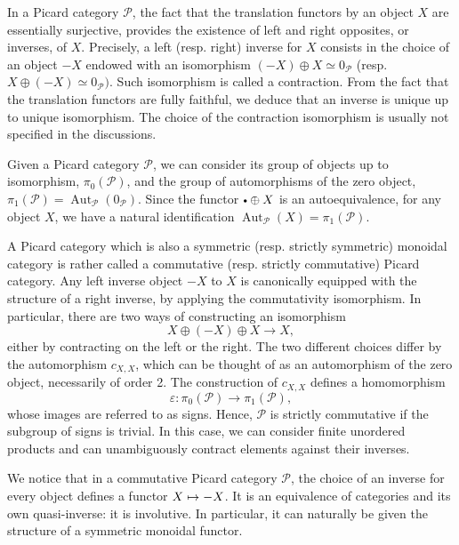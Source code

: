 \documentclass[11pt]{article}
\newcommand{\resp}{resp.\xspace}
\newcommand{\sbullet}{{\scriptscriptstyle\bullet}}
\newcommand{\csbullet}{{\raisebox{1pt}{$\sbullet$}}}
\newcommand\mto{\mathchoice{\longmapsto}{\mapsto}{\mapsto}{\mapsto}}
\theoremstyle{plain}
\theoremstyle{definition}
\newcommand{\Pcal}{\mathcal P}
\DeclareMathOperator{\Aut}{Aut}
\begin{document}
In a Picard category $\Pcal$, the fact that the translation functors by an object $X$ are essentially surjective, provides the existence of left and right opposites, or inverses, of $X$. Precisely, a left (\resp right) inverse for $X$ consists in the choice of an object $-X$ endowed with an isomorphism $(-X)\oplus X\simeq 0_{\Pcal}$ (\resp $X\oplus (-X)\simeq 0_{\Pcal})$. Such isomorphism is called a contraction. From the fact that the translation functors are fully faithful, we deduce that an inverse is unique up to unique isomorphism. The choice of the contraction isomorphism is usually not specified in the discussions.

Given a Picard category $\Pcal$, we can consider its group of objects up to isomorphism, $\pi_0(\Pcal)$, and the group of automorphisms of the zero object, $\pi_1(\Pcal) = \Aut_{\Pcal}(0_{\Pcal})$. Since the functor $\csbullet \oplus X$ is an autoequivalence, for any object $X$, we have a natural identification $\Aut_{\Pcal}(X) = \pi_1(\Pcal)$.

A Picard category which is also a symmetric (\resp strictly symmetric) monoidal category is rather called a commutative (\resp strictly commutative) Picard category. Any left inverse object $-X$ to $X$ is canonically equipped with the structure of a right inverse, by applying the commutativity isomorphism. In particular, there are two ways of constructing an isomorphism
\begin{displaymath}
X \oplus (-X) \oplus X \to X,
\end{displaymath}
either by contracting on the left or the right. The two different choices differ by the automorphism $c_{X,X}$, which can be thought of as an automorphism of the zero object, necessarily of order 2. The construction of $c_{X,X}$ defines a homomorphism
\begin{equation}\label{eq:isawthesign}
\varepsilon \colon \pi_0(\Pcal) \to \pi_1(\Pcal),
\end{equation}
whose images are referred to as signs. Hence, $\Pcal$ is strictly commutative if the subgroup of signs is trivial. In this case, we can consider finite unordered products and can unambiguously contract elements against their inverses.

We notice that in a commutative Picard category $\Pcal$, the choice of an inverse for every object defines a functor $X\mto -X$. It is an equivalence of categories and its own quasi-inverse: it is involutive. In particular, it can naturally be given the structure of a symmetric monoidal functor.
\end{document}
